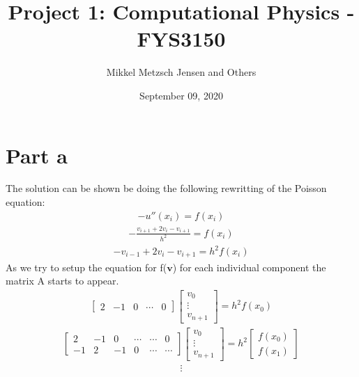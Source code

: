 \documentclass[american,a4paper,12pt]{article}
\title{Project 1: Computational Physics - FYS3150}
\author{Mikkel Metzsch Jensen and Others}
\date{September 09, 2020}
\renewcommand{\vec}[1]{\mathbf{#1}} %
\begin{document}
\maketitle

\section{Part a}
The solution can be shown be doing the following rewritting of the Poisson equation:
\begin{align*}
  -u''(x_i) = f(x_i)
\end{align*}
\begin{align*}
  -\frac{v_{i+1} + 2v_i - v_{i+1}}{h^2} = f(x_i)
\end{align*}
\begin{align*}
  -v_{i-1} + 2v_i - v_{i+1} = h^2f(x_i)
\end{align*}
As we try to setup the equation for f($\vec{v}$) for each individual component the matrix A starts to appear.
\begin{align*}
      \begin{bmatrix}
        2 & -1 & 0 & \cdots & 0
      \end{bmatrix}
      \begin{bmatrix}
        v_0 \\
        \vdots \\
        v_{n+1}
      \end{bmatrix}
= h^2f(x_0)
\end{align*}
\begin{align*}
      \begin{bmatrix}
        2 & -1 & 0 & \cdots & \cdots & 0 \\
        -1 & 2 & -1 & 0 & \cdots & \cdots
      \end{bmatrix}
      \begin{bmatrix}
        v_0 \\
        \vdots \\
        v_{n+1}
      \end{bmatrix}
= h^2
      \begin{bmatrix}
        f(x_0) \\
        f(x_1)
      \end{bmatrix}
\end{align*}
\begin{align*}
  \vdots
\end{align*}
\end{document}

